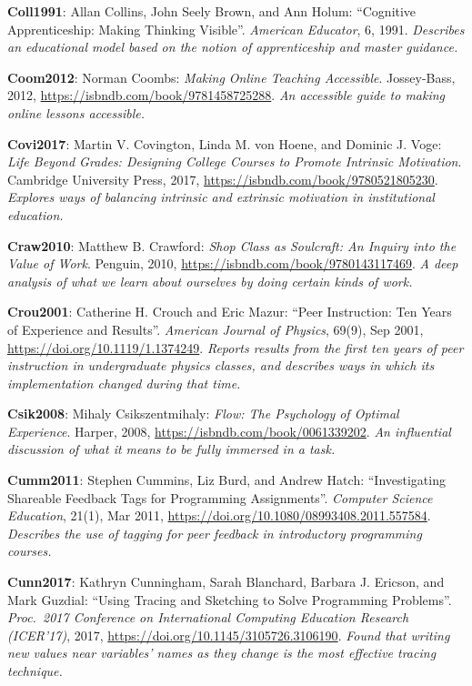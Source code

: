 \textbf{\hypertarget{b:Coll1991}{Coll1991}\label{b:Coll1991}}: Allan Collins, John Seely Brown, and Ann Holum: ``Cognitive Apprenticeship: Making Thinking Visible''. \emph{American Educator}, 6, 1991. \emph{Describes an educational model based on the notion of apprenticeship and master guidance.}

\textbf{\hypertarget{b:Coom2012}{Coom2012}\label{b:Coom2012}}: Norman Coombs: \emph{Making Online Teaching Accessible}. Jossey-Bass, 2012, \url{https://isbndb.com/book/9781458725288}. \emph{An accessible guide to making online lessons accessible.}

\textbf{\hypertarget{b:Covi2017}{Covi2017}\label{b:Covi2017}}: Martin V. Covington, Linda M. von Hoene, and Dominic J. Voge: \emph{Life Beyond Grades: Designing College Courses to Promote Intrinsic Motivation}. Cambridge University Press, 2017, \url{https://isbndb.com/book/9780521805230}. \emph{Explores ways of balancing intrinsic and extrinsic motivation in institutional education.}

\textbf{\hypertarget{b:Craw2010}{Craw2010}\label{b:Craw2010}}: Matthew B. Crawford: \emph{Shop Class as Soulcraft: An Inquiry into the Value of Work}. Penguin, 2010, \url{https://isbndb.com/book/9780143117469}. \emph{A deep analysis of what we learn about ourselves by doing certain kinds of work.}

\textbf{\hypertarget{b:Crou2001}{Crou2001}\label{b:Crou2001}}: Catherine H. Crouch and Eric Mazur: ``Peer Instruction: Ten Years of Experience and Results''. \emph{American Journal of Physics}, 69(9), Sep 2001, \url{https://doi.org/10.1119/1.1374249}. \emph{Reports results from the first ten years of peer instruction in undergraduate physics classes, and describes ways in which its implementation changed during that time.}

\textbf{\hypertarget{b:Csik2008}{Csik2008}\label{b:Csik2008}}: Mihaly Csikszentmihaly: \emph{Flow: The Psychology of Optimal Experience}. Harper, 2008, \url{https://isbndb.com/book/0061339202}. \emph{An influential discussion of what it means to be fully immersed in a task.}

\textbf{\hypertarget{b:Cumm2011}{Cumm2011}\label{b:Cumm2011}}: Stephen Cummins, Liz Burd, and Andrew Hatch: ``Investigating Shareable Feedback Tags for Programming Assignments''. \emph{Computer Science Education}, 21(1), Mar 2011, \url{https://doi.org/10.1080/08993408.2011.557584}. \emph{Describes the use of tagging for peer feedback in introductory programming courses.}

\textbf{\hypertarget{b:Cunn2017}{Cunn2017}\label{b:Cunn2017}}: Kathryn Cunningham, Sarah Blanchard, Barbara J. Ericson, and Mark Guzdial: ``Using Tracing and Sketching to Solve Programming Problems''. \emph{Proc.\ 2017 Conference on International Computing Education Research (ICER'17)}, 2017, \url{https://doi.org/10.1145/3105726.3106190}. \emph{Found that writing new values near variables' names as they change is the most effective tracing technique.}

